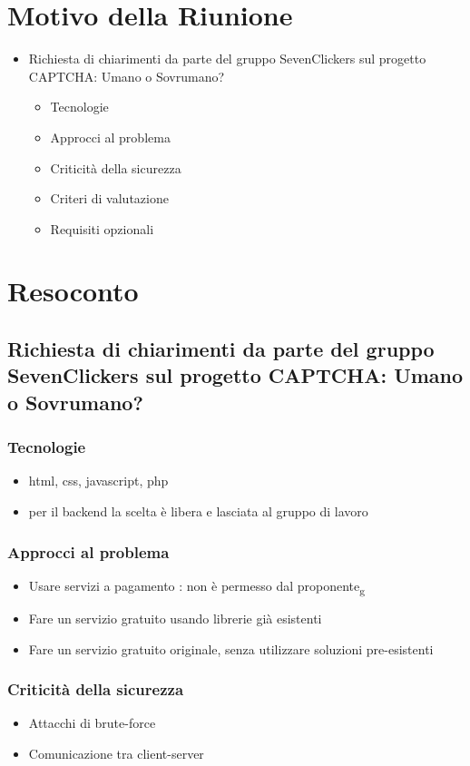 \section{Motivo della Riunione}
\begin{itemize}
    \item Richiesta di chiarimenti da parte del gruppo SevenClickers sul progetto CAPTCHA: Umano o Sovrumano?
    \begin{itemize}
        \item Tecnologie
        \item Approcci al problema
        \item Criticità della sicurezza
        \item Criteri di valutazione
        \item Requisiti opzionali
    \end{itemize}
\end{itemize}
\section{Resoconto}
\subsection{Richiesta di chiarimenti da parte del gruppo SevenClickers sul progetto CAPTCHA: Umano o Sovrumano?}
\subsubsection{Tecnologie}
\begin{itemize}
    \item html, css, javascript, php
    \item per il backend la scelta è libera e lasciata al gruppo di lavoro
\end{itemize}
\subsubsection{Approcci al problema}
\begin{itemize}
    \item Usare servizi a pagamento : non è permesso dal proponente\textsubscript{g}
    \item Fare un servizio gratuito usando librerie già esistenti
    \item Fare un servizio gratuito originale, senza utilizzare soluzioni pre-esistenti
\end{itemize}
\subsubsection{Criticità della sicurezza}
\begin{itemize}
    \item Attacchi di brute-force
    \item Comunicazione tra client-server
\end{itemize}
